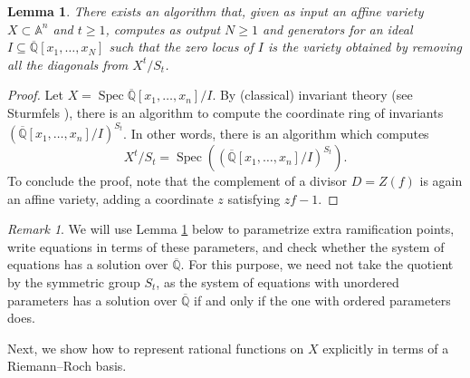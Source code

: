 \documentclass{amsproc}
\numberwithin{equation}{section}
\numberwithin{figure}{section}
\newtheorem{lemma}[equation]{Lemma}
\theoremstyle{definition}
\theoremstyle{remark}
\newtheorem{remark}[equation]{Remark}
\DeclareMathOperator{\Spec}{Spec}
\newcommand{\Qbar}{\overline{\mathbb{Q}}}
\renewcommand{\geq}{\geqslant}
\begin{document}
\begin{lemma}\label{lem: configuration}
There exists an algorithm that, given as input an affine variety $X\subset \mathbb A^n$ and $t \geq 1$, computes as output $N \geq 1$ and generators for an ideal $I \subseteq \Qbar[x_1,\ldots,x_N]$ such that the zero locus of $I$ is the variety obtained by removing all the diagonals from $X^t/S_t$.
\end{lemma}

\begin{proof}
Let $X = \Spec \Qbar[x_1,\dots,x_n]/I$. By (classical)  invariant theory (see Sturmfels \cite{Sturmfels}), there is an algorithm to compute the coordinate ring of invariants $\left(\Qbar[x_1,\ldots,x_n]/I\right)^{S_t}$. In other words, there is an algorithm which computes  $$X^t/S_t = \Spec \left(\left(\Qbar[x_1,\ldots,x_n]/I\right)^{S_t}\right).$$  To conclude the proof, note that the complement of a divisor $D=Z(f)$ is again an affine variety, adding a coordinate $z$ satisfying $z f - 1$. 
\end{proof}

\begin{remark}
We will use Lemma \ref{lem: configuration} below to parametrize extra ramification points, write equations in terms of these parameters, and check whether the system of equations has a solution over $\Qbar$.  For this purpose, we need not take the quotient by the symmetric group $S_t$, as the system of equations with unordered parameters has a solution over $\Qbar$ if and only if the one with ordered parameters does.  
\end{remark}

Next, we show how to represent rational functions on $X$ explicitly in terms of a Riemann--Roch basis.  
\end{document}
